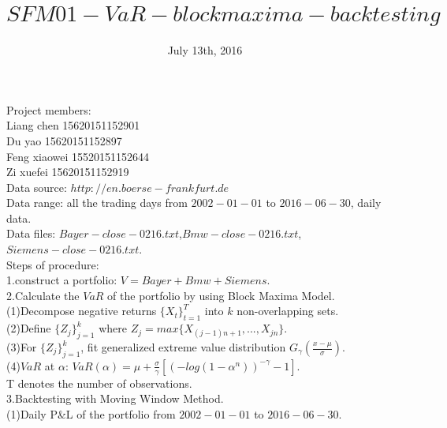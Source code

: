 \documentclass[a4paper,11pt]{article}
\begin{document}
\title{\Large{$SFM01-VaR-blockmaxima-backtesting$}}
\date{July 13th, 2016}
\maketitle
\begin{flushleft}

Project members:\\

Liang chen 15620151152901\\Du yao 15620151152897\\Feng xiaowei 15520151152644\\Zi xuefei 15620151152919\\

Data source: $http://en.boerse-frankfurt.de$\\

Data range: all the trading days from $2002-01-01$ to $2016-06-30$, daily data.\\

Data files: $Bayer-close-0216.txt$,$Bmw-close-0216.txt$,$Siemens-close-0216.txt$.\\

Steps of procedure:\\

1.construct a portfolio: $V=Bayer+Bmw+Siemens$.\\

2.Calculate the $VaR$ of the portfolio by using Block Maxima Model.\\

  (1)Decompose negative returns $\{X_t\}_{t=1}^T$ into $k$ non-overlapping sets.\\
  
  (2)Define $\{Z_j\}_{j=1}^k$ where $Z_j=max\{X_{(j-1)n+1},...,X_{jn}\}$.\\
  
  (3)For $\{Z_j\}_{j=1}^k$, fit generalized extreme value distribution $G_{\gamma}(\frac{x-\mu}{\sigma})$.\\
  
  (4)$VaR$ at $\alpha$: $VaR(\alpha)=\mu+\frac{\sigma}{\gamma}[(-log(1-\alpha^n))^{-\gamma}-1]$.\\
  T denotes the number of observations.\\
  
3.Backtesting with Moving Window Method.\\

  (1)Daily P\&L of the portfolio from $2002-01-01$ to $2016-06-30$.\\
  

\end{flushleft}
\end{document}
